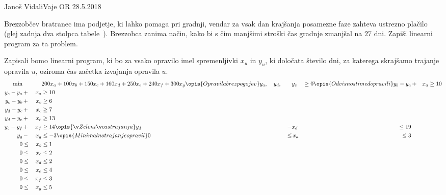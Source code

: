 \begin{naloga}{Janoš Vidali}{Vaje OR 28.5.2018}
\begin{vprasanje}
Brezzobčev bratranec ima podjetje, ki lahko pomaga pri gradnji,
vendar za vsak dan krajšanja posamezne faze zahteva ustrezno plačilo
(glej zadnja dva stolpca tabele~\tab[brezzobec]).
Brezzobca zanima način,
kako bi s čim manjšimi stroški čas gradnje zmanjšal na $27$ dni.
Zapiši linearni program za ta problem.
\end{vprasanje}

\begin{odgovor}
Zapisali bomo linearni program,
ki bo za vsako opravilo imel spremenljivki $x_u$ in $y_u$,
ki določata število dni, za katerega skrajšamo trajanje opravila $u$,
oziroma čas začetka izvajanja opravila $u$.
\begin{alignat*}{2}
\min &&&{} 200 x_a + 100 x_b + 150 x_c + 160 x_d + 250 x_e + 240 x_f + 300 x_g
\opis{Opravila brez pogojev}
y_a, \quad y_d, &&{} y_e &\ge 0
\opis{Odvisnosti med opravili}
y_b - y_a &\,+& x_a &\ge 10 \\
y_e - y_a &\,+& x_a &\ge 10 \\
y_c - y_b &\,+& x_b &\ge 6 \\
y_d - y_c &\,+& x_c &\ge 7 \\
y_d - y_e &\,+& x_e &\ge 13 \\
y_c - y_f &\,+& x_f &\ge 14
\opis{Želeni čas trajanja}
y_d &\,-& x_d &\le 19 \\
y_g &\,-& x_g &\le -3
\opis{Minimalno trajanje opravil}
0 &\le&\, x_a &\le 3 \\
0 &\le&\, x_b &\le 1 \\
0 &\le&\, x_c &\le 2 \\
0 &\le&\, x_d &\le 2 \\
0 &\le&\, x_e &\le 4 \\
0 &\le&\, x_f &\le 3 \\
0 &\le&\, x_g &\le 5
\end{alignat*}
\end{odgovor}
\end{naloga}
